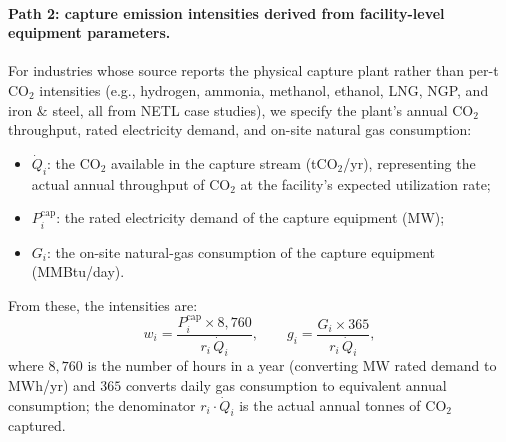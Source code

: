 \documentclass[11pt]{article}
\newcommand{\cotwo}{\ensuremath{\mathrm{CO_2}}}
\begin{document}
\paragraph{Path 2: capture emission intensities derived from facility-level equipment parameters.}
For industries whose source reports the physical capture plant rather than per-t\cotwo{} intensities (e.g., hydrogen, ammonia, methanol, ethanol, LNG, NGP, and iron \& steel, all from NETL case studies), we specify the plant's annual \cotwo{} throughput, rated electricity demand, and on-site natural gas consumption:
\begin{itemize}
  \item $\dot{Q}_i$: the \cotwo{} available in the capture stream (t\cotwo{}/yr), representing the actual annual throughput of \cotwo{} at the facility's expected utilization rate;
  \item $P_i^{\text{cap}}$: the rated electricity demand of the capture equipment (MW);
  \item $G_i$: the on-site natural-gas consumption of the capture equipment (MMBtu/day).
\end{itemize}
\noindent
From these, the intensities are:
%
\begin{equation}
  w_i = \frac{P_i^{\text{cap}} \times 8{,}760}{r_i\,\dot{Q}_i}, \qquad
  g_i = \frac{G_i \times 365}{r_i\,\dot{Q}_i},
  \label{eq:cap_intensities}
\end{equation}
%
where $8{,}760$ is the number of hours in a year (converting MW rated demand to MWh/yr) and $365$ converts daily gas consumption to equivalent annual consumption; the denominator $r_i \cdot \dot{Q}_i$ is the actual annual tonnes of \cotwo{} captured.
\end{document}
